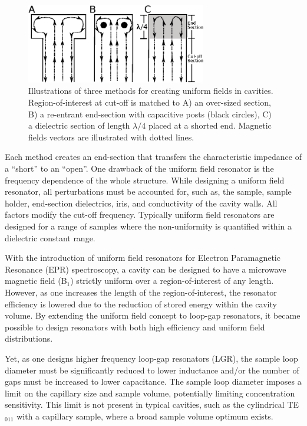 \begin{figure}[htp]
 \centering
 \includegraphics[width=0.7\textwidth]{Kapitel/Ch2-Images/02-UFIllustration.eps}
 \caption[Methods for creating uniform fields in cavities.]{Illustrations of three methods for creating uniform fields in cavities. Region-of-interest at cut-off is matched to A) an  over-sized section, B) a re-entrant end-section with capacitive posts (black circles), C) a dielectric section of length $\lambda/4$ placed at a shorted end. Magnetic fields vectors are illustrated with dotted lines.}
 \label{fig:UFmethods}
\end{figure}

Each method creates an end-section that transfers the characteristic impedance of a ``short'' to an ``open''. One drawback of the uniform field resonator is the frequency dependence of the whole structure. While designing a uniform field resonator, all perturbations must be accounted for, such as, the sample, sample holder, end-section dielectrics, iris, and conductivity of the cavity walls. All factors modify the cut-off frequency. Typically uniform field resonators are designed for a range of samples where the non-uniformity is quantified within a dielectric constant range. 



With the introduction of uniform field resonators for Electron Paramagnetic Resonance (EPR) spectroscopy, a cavity can be designed to have a microwave magnetic field (B$_1$) strictly uniform over a region-of-interest of any length. \cite{mett2001axially, anderson2002, mett2002recav, hyde2004cavity} However, as one increases the length of the region-of-interest, the resonator efficiency is lowered due to the reduction of stored energy within the cavity volume. By extending the uniform field concept to loop-gap resonators,\cite{UFLGR} it became possible to design resonators with both high efficiency and uniform field distributions. \cite{UFLGR2017}  

Yet, as one designs higher frequency loop-gap resonators (LGR), the sample loop diameter must be significantly reduced to lower inductance and/or the number of gaps must be increased to lower capacitance. \cite{Sidabras2007, MainaliLGR, UFLGR2017} The sample loop diameter imposes a limit on the capillary size and sample volume, potentially limiting concentration sensitivity. This limit is not present in typical cavities, such as the cylindrical TE$_{011}$ with a capillary sample, where a broad sample volume optimum exists. \cite{Nesmelov2004}

